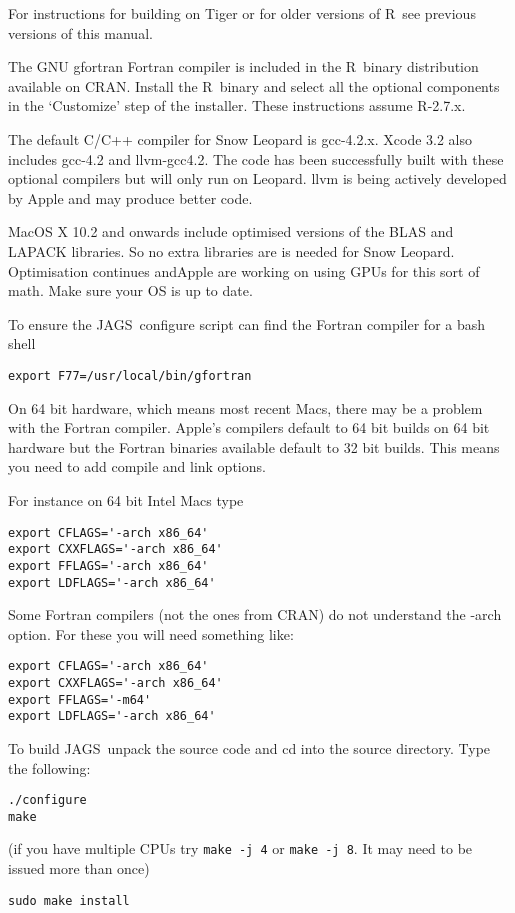 \documentclass[11pt, a4paper, titlepage]{article}
\newcommand{\JAGS}{\textsf{JAGS}}
\newcommand{\R}{\textsf{R}}
\begin{document}
For instructions for building on Tiger or for older versions of
\R\ see previous versions of this manual.

The GNU gfortran Fortran compiler is included in the \R\ binary
distribution available on CRAN. Install the \R\ binary and select all
the optional components in the `Customize' step of the installer.
These instructions assume R-2.7.x.

The default C/C++ compiler for Snow Leopard is gcc-4.2.x. Xcode 3.2
also includes gcc-4.2 and llvm-gcc4.2.  The code has been successfully
built with these optional compilers but will only run on Leopard.
llvm is being actively developed by Apple and may produce better code.

MacOS X 10.2 and onwards include optimised versions of the BLAS and
LAPACK libraries.  So no extra libraries are is needed for Snow
Leopard.  Optimisation continues andApple are working on using GPUs
for this sort of math.  Make sure your OS is up to date.

To ensure the \JAGS\ configure script can find the Fortran compiler
for a bash shell
\begin{verbatim}
export F77=/usr/local/bin/gfortran
\end{verbatim}

On 64 bit hardware, which means most recent Macs, there may be a 
problem with the Fortran compiler.  Apple's compilers default to 64 bit 
builds on 64 bit hardware but the Fortran binaries available default to 
32 bit builds. This means you need to add compile and link options.

For instance on 64 bit Intel Macs type
\begin{verbatim}
export CFLAGS='-arch x86_64'
export CXXFLAGS='-arch x86_64'
export FFLAGS='-arch x86_64'
export LDFLAGS='-arch x86_64'
\end{verbatim}

Some Fortran compilers (not the ones from CRAN) do not understand 
the -arch option. For these you will need something like:
\begin{verbatim}
export CFLAGS='-arch x86_64'
export CXXFLAGS='-arch x86_64'
export FFLAGS='-m64'
export LDFLAGS='-arch x86_64'
\end{verbatim}

To build \JAGS\ unpack the source code and cd into the source  
directory. Type the following:
\begin{verbatim}
./configure
make
\end{verbatim}
(if you have multiple CPUs try \verb+make -j 4+ or
\verb+make -j 8+. It may need to be issued more than once)
\begin{verbatim}
sudo make install
\end{verbatim}
\end{document}

